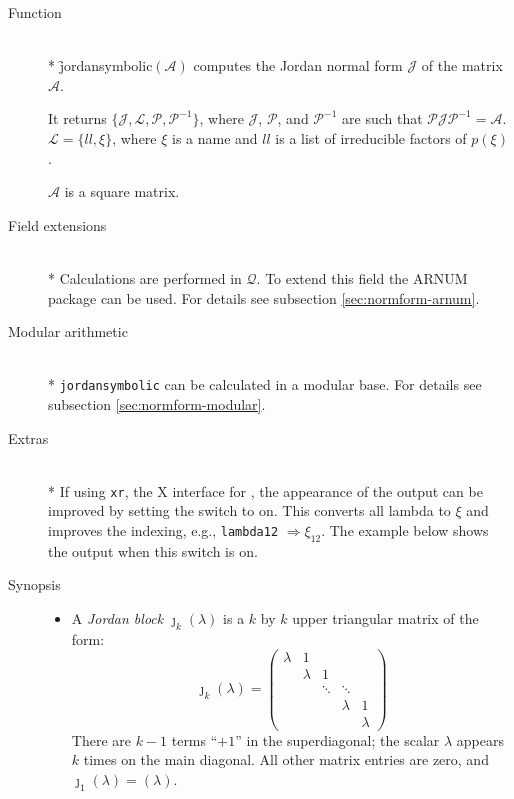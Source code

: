 \begin{description}
\item[Function]\mbox{}\\*
\f{jordansymbolic}$(\mathcal{A})$ computes the Jordan
normal form $\mathcal{J}$ of the matrix $\mathcal{A}$.

It returns $\{\mathcal{J}, \mathcal{L}, \mathcal{P}, \mathcal{P}^{-1}\}$, where
$\mathcal{J}$, $\mathcal{P}$, and $\mathcal{P}^{-1}$ are such that $\mathcal{P J P}^
{-1} = \mathcal{A}$. $\mathcal{L} = \{ ll , \xi \}$, where $\xi$ is
a name and $ll$ is a list of irreducible factors of $p(\xi)$.

$\mathcal{A}$ is a square matrix.

\item[Field extensions]\mbox{}\\*
Calculations are performed in $\mathcal{Q}$. To extend this field the
{\small ARNUM} package can be used. For details see subsection \ref{sec:normform-arnum}.

\item[Modular arithmetic]\mbox{}\\*
{\tt jordansymbolic} can be calculated in a modular base. For details
see subsection \ref{sec:normform-modular}.

\item[Extras]\mbox{}\\*
\hypertarget{switch:LOOKING_GOOD}{}
If using \texttt{xr}, the X interface for \REDUCE, the appearance of the
output can be improved by setting the switch  to on. This
converts all lambda to $\xi$ and improves the indexing, e.g., \texttt{lambda12}
$\Rightarrow \xi_{12}$. The example below shows the
output when this switch is on.

\item[Synopsis]

\begin{itemize}
\item A \emph{Jordan block} ${\jmath}_{k}(\lambda)$ is a $k$ by $k$
      upper triangular matrix of the form:
%
      \[
      {\jmath}_{k}(\lambda) = \begin{pmatrix} \lambda & 1
      &  &  & \\  &  \lambda & 1  & & \\ &
      & \ddots & \ddots & \\ &  &  &  \lambda & 1 \\ &
      &  &  & \lambda \end{pmatrix}
      \]
%
      There are $k-1$ terms ``$+1$'' in the superdiagonal; the scalar
      $\lambda$ appears $k$ times on the main diagonal. All other
      matrix entries are zero, and ${\jmath}_{1}(\lambda) = (\lambda)$.


\end{itemize}
\end{description}
